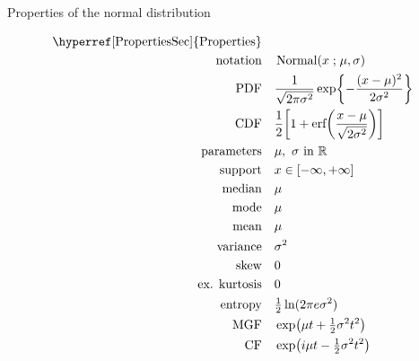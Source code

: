 

\begin{table*}[t!]
\caption[Normal distribution -- Properties]{Properties of the normal distribution}

\begin{align*}
\text{\hyperref[PropertiesSec]{Properties}}  \quad& \\
\text{notation} \quad & \op{Normal}(x\given \mu,\sigma)	\checked
\\
\text{PDF}\quad &   \frac{1}{\sqrt{2 \pi \sigma^2}}  \exp\Left\{ - \frac{( x-\mu)^2}{2\sigma^2} \Right\} \checked
\\
\text{CDF} \quad  &   \frac{1}{2}\Left[  1 + \text{erf}\Left(\frac{x-\mu}{\sqrt{2 \sigma^2}} \Right) \Right]	\checked
\\
\text{parameters}\quad &   \mu,\ \sigma \text{ in } \mathbb{R}						\checked
\\
\text{support} \quad &   x \in [-\infty, + \infty]									\checked
\\
\text{median} \quad  &  \mu												\checked
\\
\text{mode} \quad  & \mu													\checked
\\
\text{mean} \quad  &  \mu													\checked
\\
\text{variance} \quad  & \sigma^2											\checked
\\
\text{skew} \quad  &  0													\checked
\\
\text{ex. kurtosis} \quad  &  0													\checked
\\	
\text{entropy} \quad  & \tfrac{1}{2} \ln(2\pi e \sigma^2)							\checked
\\
\text{MGF} \quad  &  \exp\Left({\mu t + \tfrac{1}{2} \sigma^2 t^2 }\Right)				\checked
\\
\text{CF} \quad  &  \exp\Left({i \mu t - \tfrac{1}{2} \sigma^2 t^2}\Right)					\checked
\end{align*}

\end{table*}
